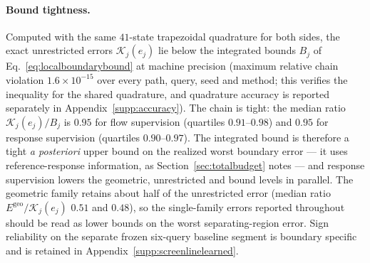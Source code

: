 \paragraph{Bound tightness.}
Computed with the same $41$-state trapezoidal quadrature for both
sides, the exact unrestricted errors $\mathcal K_j(e_j)$ lie below the
integrated bounds $B_j$ of Eq.~\eqref{eq:localboundarybound} at machine
precision (maximum relative chain violation $1.6\times10^{-15}$ over
every path, query, seed and method; this verifies the inequality for
the shared quadrature, and quadrature accuracy is reported separately
in Appendix~\ref{supp:accuracy}). The chain is tight: the median ratio
$\mathcal K_j(e_j)/B_j$ is $0.95$ for flow supervision (quartiles
$0.91$--$0.98$) and $0.95$ for response supervision (quartiles
$0.90$--$0.97$). The integrated bound is therefore a tight
\emph{a posteriori} upper bound on the realized worst boundary error
--- it uses reference-response information, as
Section~\ref{sec:totalbudget} notes --- and response supervision lowers
the geometric, unrestricted and bound levels in parallel. The
geometric family retains about half of the unrestricted error (median
ratio $E^{\mathrm{geo}}/\mathcal K_j(e_j)$ $0.51$ and $0.48$), so the
single-family errors reported throughout should be read as lower
bounds on the worst separating-region error. Sign reliability on the
separate frozen six-query baseline segment is boundary specific and is
retained in Appendix~\ref{supp:screenlinelearned}.
